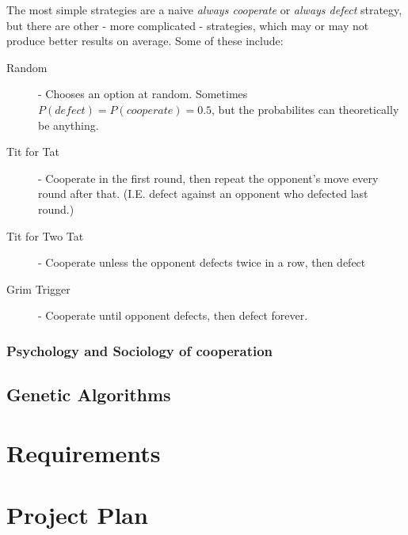 \documentclass{article}
\begin{document}
The most simple strategies are a naive \emph{always cooperate} or \emph{always defect} strategy, but there are other - more complicated - strategies, which may or may not produce better results on average. Some of these include:
\begin{description}
	\item[Random] - Chooses an option at random. Sometimes $P(defect) = P(cooperate) = 0.5$, but the probabilites can theoretically be anything.
	\item[Tit for Tat] - Cooperate in the first round, then repeat the opponent's move every round after that. (I.E. defect against an opponent who defected last round.)
	\item[Tit for Two Tat] - Cooperate unless the opponent defects twice in a row, then defect
	\item[Grim Trigger] - Cooperate until opponent defects, then defect forever.
\end{description}


\subsubsection{Psychology and Sociology of cooperation}
\label{sec:psychology-sociology-cooperation}

\subsection{Genetic Algorithms}
\label{sec:genetic-algorithms}

\section{Requirements}
\label{sec:requirements}

\section{Project Plan}
\label{sec:project-plan}
\end{document}
